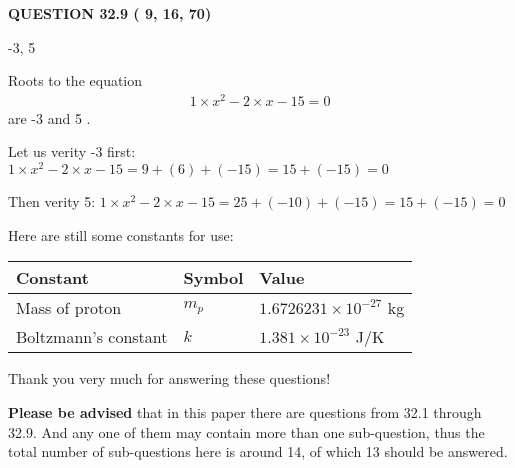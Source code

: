 \documentclass[12pt]{article}
\begin{document}
 
 
  
\vspace{0.2in}
  
{\textbf{\Large{QUESTION
32.9 
 (          9,         16,         70)
}}}
  
  


 
 
\noindent{}

-3,  %
5
 
 
 
 
 
\noindent{}

Roots to the equation
\begin{eqnarray*}
1 \times x^2  %
-2
                 \times x    %
-15 =0
\end{eqnarray*}
are  %
-3 and  %
5 .
 
Let us verity  %
-3 first:
$  %
1 \times x^2  %
-2
                 \times x    %
-15
  = %
9+( %
6)+( %
-15)
  = %
15+( %
-15)
  = %
0
$
 
Then verity  %
5:
$  %
1 \times x^2  %
-2
                 \times x    %
-15
  = %
25+( %
-10)+( %
-15)
  = %
15+( %
-15)
  = %
0
$
 
 
 
   
   
 \vspace{0.2in}
Here are still some constants for use:
 
 
\noindent\begin{tabular}{|l|l|l|}
\hline
Constant & Symbol & Value \\
\hline
 
Mass of proton &
$m_p$ &
 $ 1.6726231 \times 10^{-27} $
kg \\
\hline
 
Boltzmann's constant &
$k$ &
 $ 1.381 \times 10^{-23} $
J/K \\
\hline
 
\end{tabular}
 
Thank you very much for answering these questions!
 
{\textbf{\large{Please be advised}}} that in this paper there are questions from
32.1 through
32.9.
And any one of them may contain more than one sub-question, thus the total number
of sub-questions here is around 14, of which
13 should be answered.
 
\end{document}
